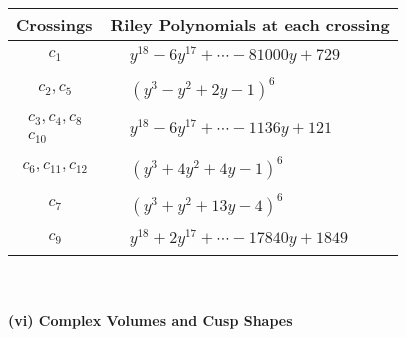 \documentclass[1p]{elsarticle_modified}
\theoremstyle{definition}
\begin{document}
\begin{tabular}{m{50pt}|m{274pt}}
Crossings & \hspace{64pt}Riley Polynomials at each crossing \\
\hline $$\begin{aligned}c_{1}\end{aligned}$$&$\begin{aligned}
&y^{18}-6 y^{17}+\cdots-81000 y+729
\end{aligned}$\\
\hline $$\begin{aligned}c_{2},c_{5}\end{aligned}$$&$\begin{aligned}
&(y^3- y^2+2 y-1)^6
\end{aligned}$\\
\hline $$\begin{aligned}c_{3},c_{4},c_{8}\\c_{10}\end{aligned}$$&$\begin{aligned}
&y^{18}-6 y^{17}+\cdots-1136 y+121
\end{aligned}$\\
\hline $$\begin{aligned}c_{6},c_{11},c_{12}\end{aligned}$$&$\begin{aligned}
&(y^3+4 y^2+4 y-1)^6
\end{aligned}$\\
\hline $$\begin{aligned}c_{7}\end{aligned}$$&$\begin{aligned}
&(y^3+y^2+13 y-4)^6
\end{aligned}$\\
\hline $$\begin{aligned}c_{9}\end{aligned}$$&$\begin{aligned}
&y^{18}+2 y^{17}+\cdots-17840 y+1849
\end{aligned}$\\
\hline
\end{tabular}\\~\\
\newpage\flushleft \textbf{(vi) Complex Volumes and Cusp Shapes}
\end{document}
